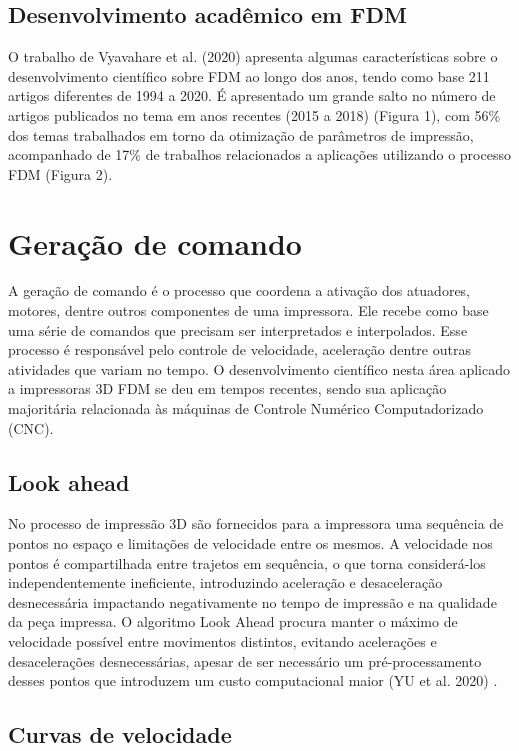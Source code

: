 \subsection{Desenvolvimento acadêmico em FDM}
O trabalho de Vyavahare et al. (2020) \cite{vyavahare20} apresenta algumas 
características sobre o desenvolvimento científico sobre 
FDM ao longo dos anos, tendo como base 211 artigos diferentes 
de 1994 a 2020. É apresentado um grande salto no número de 
artigos publicados no tema em anos recentes (2015 a 2018) 
(Figura 1), com 56\% dos temas trabalhados em torno da 
otimização de parâmetros de impressão, acompanhado de 17\% de 
trabalhos relacionados a aplicações utilizando o processo FDM 
(Figura 2).

\section{Geração de comando}
A geração de comando é o processo que coordena a ativação dos 
atuadores, motores, dentre outros componentes de uma impressora. 
Ele recebe como base uma série de comandos que precisam ser 
interpretados e interpolados. Esse processo é responsável pelo 
controle de velocidade, aceleração dentre outras atividades que 
variam no tempo. O desenvolvimento científico nesta área 
aplicado a impressoras 3D FDM se deu em tempos recentes, 
sendo sua aplicação majoritária relacionada às máquinas de 
Controle Numérico Computadorizado (CNC).

\subsection{Look ahead}
No processo de impressão 3D são fornecidos para a impressora 
uma sequência de pontos no espaço e limitações de velocidade 
entre os mesmos. A velocidade nos pontos é compartilhada entre 
trajetos em sequência, o que torna considerá-los 
independentemente ineficiente, introduzindo aceleração e 
desaceleração desnecessária impactando negativamente no tempo 
de impressão e na qualidade da peça impressa.
O algoritmo Look Ahead procura manter o máximo de velocidade 
possível entre movimentos distintos, evitando acelerações e 
desacelerações desnecessárias, apesar de ser necessário um 
pré-processamento desses pontos que introduzem um custo 
computacional maior (YU et al. 2020) \cite{yu20}.

\subsection{Curvas de velocidade}

